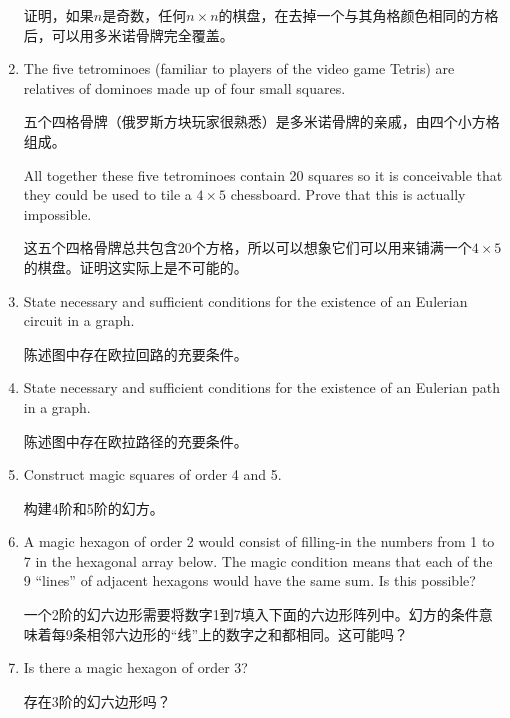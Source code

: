 \begin{enumerate}
    \noindent 证明，如果$n$是奇数，任何$n \times n$的棋盘，在去掉一个与其角格颜色相同的方格后，可以用多米诺骨牌完全覆盖。
    \wbvfill
    
    \item The five  tetrominoes (familiar to players of the video game
    Tetris) are relatives of dominoes made up of four small squares.
    
    \noindent 五个四格骨牌（俄罗斯方块玩家很熟悉）是多米诺骨牌的亲戚，由四个小方格组成。
    \begin{center}
    
    \end{center}
    
    \noindent All together these five tetrominoes contain 20 squares
    so it is conceivable that they could be used to tile a $4 \times 5$
    chessboard. Prove that this is actually impossible.
    
    \noindent 这五个四格骨牌总共包含20个方格，所以可以想象它们可以用来铺满一个$4 \times 5$的棋盘。证明这实际上是不可能的。
    
    \wbvfill
    
    \workbookpagebreak
    
    \item State necessary and sufficient conditions for the existence of
    an Eulerian circuit in a graph.
    
    \noindent 陈述图中存在欧拉回路的充要条件。
    \wbvfill
    
    \item  State necessary and sufficient conditions for the existence of
    an Eulerian path in a graph.
    
    \noindent 陈述图中存在欧拉路径的充要条件。
    \wbvfill
    
    \newpage
    
    \item Construct magic squares of order 4 and 5.
    
    \noindent 构建4阶和5阶的幻方。
    
    \wbvfill
    
    \workbookpagebreak
    
    \item A magic hexagon of order 2 would consist of filling-in
    the numbers from 1 to 7 in the hexagonal array below. The magic
    condition means that each of the 9 ``lines'' of adjacent hexagons
    would have the same sum.  Is this possible?
    
    \noindent 一个2阶的幻六边形需要将数字1到7填入下面的六边形阵列中。幻方的条件意味着每9条相邻六边形的“线”上的数字之和都相同。这可能吗？
    \begin{center}
    
    \end{center}
    
    \wbvfill
    
    \item Is there a magic hexagon of order 3?
    
    \noindent 存在3阶的幻六边形吗？
    
    \wbvfill
    
    \end{enumerate}
    
    
    
